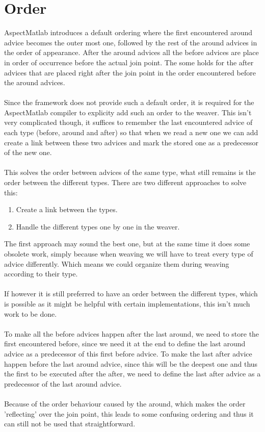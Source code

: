 \documentclass[a4paper]{report}
\begin{document}
\section{Order}
AspectMatlab introduces a default ordering where the first encountered around advice becomes the outer most one, followed by the rest of the around advices in the order of appearance. After the around advices all the before advices are place in order of occurrence before the actual join point. The some holds for the after advices that are placed right after the join point in the order encountered before the around advices.\\
\\
Since the framework does not provide such a default order, it is required for the AspectMatlab compiler to explicity add such an order to the weaver. This isn't very complicated though, it suffices to remember the last encountered advice of each type (before, around and after) so that when we read a new one we can add create a link between these two advices and mark the stored one as a predecessor of the new one.\\
\\
This solves the order between advices of the same type, what still remains is the order between the different types. There are two different approaches to solve this:
\begin{enumerate}
\item Create a link between the types.
\item Handle the different types one by one in the weaver.
\end{enumerate}
The first approach may sound the best one, but at the same time it does some obsolete work, simply because when weaving we will have to treat every type of advice differently. Which means we could organize them during weaving according to their type.\\
\\
If however it is still preferred to have an order between the different types, which is possible as it might be helpful with certain implementations, this isn't much work to be done.\\
\\
To make all the before advices happen after the last around, we need to store the first encountered before, since we need it at the end to define the last around advice as a predecessor of this first before advice. To make the last after advice happen before the last around advice, since this will be the deepest one and thus the first to be executed after the after, we need to define the last after advice as a predecessor of the last around advice. \\
\\
Because of the order behaviour caused by the around, which makes the order 'reflecting' over the join point, this leads to some confusing ordering and thus it can still not be used that straightforward.
\end{document}
